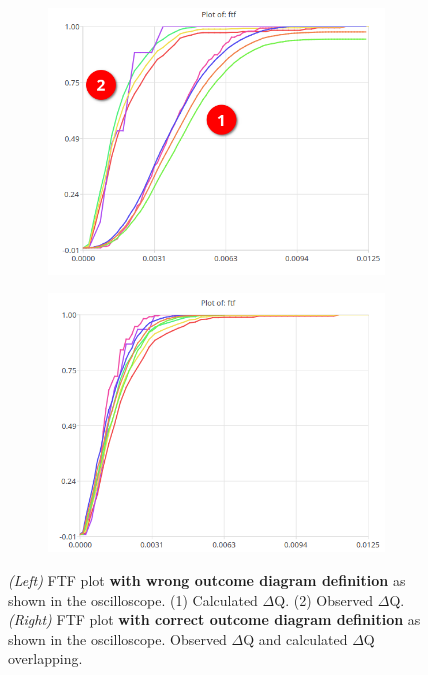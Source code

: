         \begin{figure}[H]
            \centering
            \begin{subfigure}{.5\textwidth}
                \centering
                \includegraphics[width =0.98\textwidth]{img/bad2.png}
                \label{fig:bad}
            \end{subfigure}%
            \begin{subfigure}{.5\textwidth}%
                \centering%
                \includegraphics[width =0.98\textwidth]{img/good.png}%
                \label{fig:good}%
            \end{subfigure}%
            \caption{\textit{(Left)} FTF plot \textbf{with wrong outcome diagram definition} as shown in the oscilloscope. (1) Calculated $\Delta$Q. (2) Observed $\Delta$Q. \\
            \textit{(Right)} FTF plot \textbf{with correct outcome diagram definition} as shown in the oscilloscope. Observed $\Delta$Q and calculated $\Delta$Q overlapping.}
            \label{fig:ftf_osc}%
        \end{figure}%
